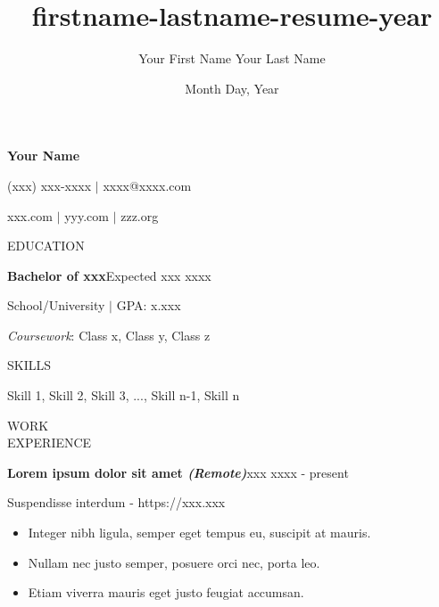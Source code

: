 \documentclass{article}
\title{firstname-lastname-resume-year}
\author{Your First Name Your Last Name}
\date{Month Day, Year} %
\newcommand{\sectionSpace}{\vspace{0.3in}}
\begin{document}
\begin{center}
{\huge \textbf{Your Name}}

\vspace{0.05in}

{\large(xxx) xxx-xxxx $\vert$ xxxx@xxxx.com}

\vspace{0.05in}

{\large xxx.com $\vert$ yyy.com $\vert$ zzz.org}
\end{center}

\hrulefill

\vspace{0.05in}

\begin{minipage}[t]{0.125\linewidth}
\uppercase{Education}
\end{minipage}%
\hfill
\begin{minipage}[t]{0.85\linewidth}
\textbf{Bachelor of xxx}\hfill Expected xxx xxxx

School/University $\vert$ GPA: x.xxx

\hangindent=0.75in\emph{Coursework}: Class x, Class y, Class z
\end{minipage}

\sectionSpace

\begin{minipage}[t]{0.125\linewidth}
\uppercase{Skills}
\end{minipage}%
\hfill
\begin{minipage}[t]{0.85\linewidth}
Skill 1, Skill 2, Skill 3, ..., Skill n-1, Skill n
\end{minipage}

\sectionSpace

\begin{minipage}[t]{0.125\linewidth}
\uppercase{Work\\Experience}
\end{minipage}%
\hfill
\begin{minipage}[t]{0.85\linewidth}
\textbf{Lorem ipsum dolor sit amet \emph{(Remote)}}\hfill xxx xxxx - present

Suspendisse interdum - https://xxx.xxx

\begin{itemize}[noitemsep,topsep=0pt]
   \item Integer nibh ligula, semper eget tempus eu, suscipit at mauris.
   \item Nullam nec justo semper, posuere orci nec, porta leo.
   \item Etiam viverra mauris eget justo feugiat accumsan.
 \end{itemize}
\end{minipage}
\end{document}
